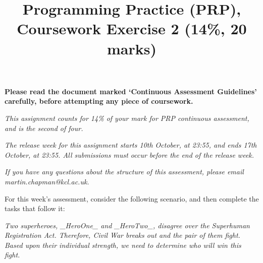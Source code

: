 \documentclass[11pt]{article}
\title{Programming Practice (PRP), Coursework Exercise 2 (14\%, 20 marks)}
\date{}                                           %
\begin{document}
\maketitle

\textbf{Please read the document marked `Continuous Assessment Guidelines' carefully, before attempting any piece of coursework.}

\emph{This assignment counts for 14\% of your mark for PRP continuous assessment, and is the second of four.}

\emph{The release week for this assignment starts 10th October, at 23:55, and ends 17th October, at 23:55. All submissions must occur before the end of the release week.}

\emph{If you have any questions about the structure of this assessment, please email \\ martin.chapman@kcl.ac.uk.}

For this week's assessment, consider the following scenario, and then complete the tasks that follow it:

\emph{Two superheroes, _HeroOne_ and _HeroTwo_, disagree over the Superhuman Registration Act. Therefore, Civil War breaks out and the pair of them fight. Based upon their individual strength, we need to determine who will win this fight.}
\end{document}

